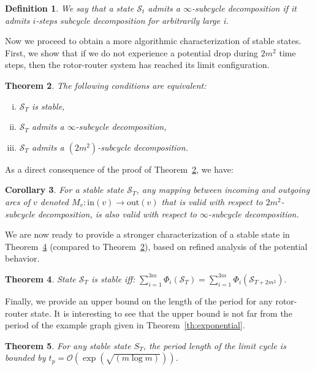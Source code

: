 \documentclass{article}[11pt,letter]
\newtheorem{definition}{Definition}[section]
\newtheorem{theorem}[definition]{Theorem}
\newtheorem{corollary}[definition]{Corollary}
\newcommand{\bigo}{\mathcal{O}}
\newcommand{\state}{\mathcal{S}}
\newcommand{\inedg}{\mathrm{in}}
\newcommand{\outedg}{\mathrm{out}}
\begin{document}
\begin{definition}
We say that a state $\state_t$ admits a \emph{$\infty$-subcycle decomposition} if it admits $i$-steps subcycle decomposition for arbitrarily large i.
\end{definition}

Now we proceed to obtain a more algorithmic characterization of stable states. First, we show that if we do not experience a potential drop during $2m^2$ time steps, then the rotor-router system has reached its limit configuration.

\begin{theorem}
\label{th:subcycle}
The following conditions are equivalent:
\begin{enumerate}[(i)]
\item \label{subcycle1} $\state_T$ is stable,
\item \label{subcycle2} $\state_T$ admits a $\infty$-subcycle decomposition,
\item \label{subcycle3} $\state_T$ admits a $(2m^2)$-subcycle decomposition.
\end{enumerate}
\end{theorem}

As a direct consequence of the proof of Theorem~\ref{th:subcycle}, we have:
\begin{corollary}
\label{ob:subc}
For a stable state $\state_T$, any mapping between incoming and outgoing arcs of $v$ denoted $M_v : \inedg(v) \to \outedg(v)$ that is valid with respect to $2m^2$-subcycle decomposition, is also valid with respect to $\infty$-subcycle decomposition.
\end{corollary}

We are now ready to provide a stronger characterization of a stable state in Theorem~\ref{th:stable_charact} (compared to Theorem~\ref{th:subcycle}), based on refined analysis of the potential behavior.
\begin{theorem}
\label{th:stable_charact}
State $\state_T$ is stable iff:
$\sum_{i=1}^{3m} \Phi_{i}(\state_T) = \sum_{i=1}^{3m} \Phi_{i}(\state_{T+2m^2}).$
\end{theorem}

Finally, we provide an upper bound on the length of the period for any rotor-router state. It is interesting to see that the upper bound is not far from the period of the example graph given in Theorem~\ref{th:exponential}.

\begin{theorem}
For any stable state $S_{T}$, the period length of the limit cycle is bounded by $t_p = \bigo(\exp(\sqrt{(m \log m)}))$.
\end{theorem}
\end{document}
